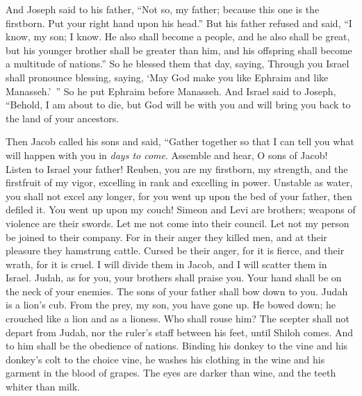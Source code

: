 \begin{biblechapter}
\verse And Joseph said to his father, “Not so, my father; because this one is the firstborn. Put your right hand upon his head.”
\verse But his father refused and said, “I know, my son; I know. He also shall become a people, and he also shall be great, but his younger brother shall be greater than him, and his offspring shall become a multitude of nations.”
\verse So he blessed them that day, saying, Through you Israel shall pronounce blessing, saying, 
‘May God make you like Ephraim and like Manasseh.’ ”
\verse So he put Ephraim before Manasseh.
\verse And Israel said to Joseph, “Behold, I am about to die, but God will be with you and will bring you back to the land of your ancestors.
\end{biblechapter}

\begin{biblechapter} %
 Then Jacob called his sons and said, “Gather together so that I can tell you what will happen with you in \textit{days to come}.
\verse Assemble and hear, O sons of Jacob! 
Listen to Israel your father!
\verse Reuben, you are my firstborn, 
my strength, and the firstfruit of my vigor, 
excelling in rank and excelling in power.
\verse Unstable as water, you shall not excel any longer, 
for you went up upon the bed of your father, 
then defiled it. You went up upon my couch!
\verse Simeon and Levi are brothers; 
weapons of violence are their swords. 
Let me not come into their council.
\verse Let not my person be joined to their company. 
For in their anger they killed men, 
and at their pleasure they hamstrung cattle.
\verse Cursed be their anger, for it is fierce, 
and their wrath, for it is cruel. 
I will divide them in Jacob, 
and I will scatter them in Israel.
\verse Judah, as for you, your brothers shall praise you. 
Your hand shall be on the neck of your enemies. 
The sons of your father shall bow down to you.
\verse Judah is a lion’s cub. 
From the prey, my son, you have gone up. 
He bowed down; he crouched like a lion and as a lioness. 
Who shall rouse him?
\verse The scepter shall not depart from Judah, 
nor the ruler’s staff between his feet, 
until Shiloh comes. 
And to him shall be the obedience of nations.
\verse Binding his donkey to the vine 
and his donkey’s colt to the choice vine, 
he washes his clothing in the wine 
and his garment in the blood of grapes.
\verse The eyes are darker than wine, 
and the teeth whiter than milk.

\end{biblechapter}
